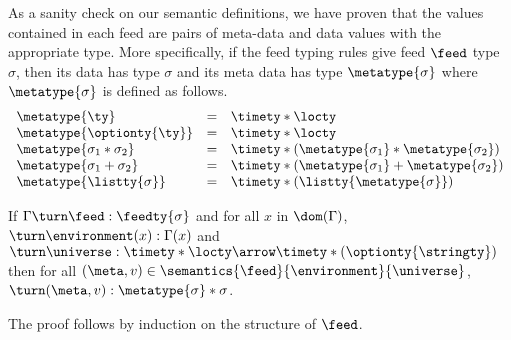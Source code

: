 As a sanity check on our semantic definitions, we have proven
that the values contained in each feed are pairs of meta-data and data
values with the appropriate type.  More specifically, if the feed typing
rules give feed $\feed$ type $\sigma$, then its data has type $\sigma$ and
its meta data has type $\metatype{\sigma}$ where $\metatype{\sigma}$ is
defined as follows.
\[
\begin {array} {lcl}
\metatype{\ty} & = & \timety * \locty \\
\metatype{\optionty{\ty}} & = & \timety * \locty \\
\metatype{\sigma_1 * \sigma_2} & = & \timety * (\metatype{\sigma_1} * \metatype{\sigma_2}) \\
\metatype{\sigma_1 + \sigma_2} & = & \timety * (\metatype{\sigma_1} + \metatype{\sigma_2}) \\
\metatype{\listty{\sigma}} & = & \timety * (\listty{\metatype{\sigma}}) \\
\end{array}
\]
\begin{theorem}
If $\Gamma \turn \feed : \feedty{\sigma}$ and
for all $x$ in $\dom(\Gamma)$, $\turn \environment(x) : \Gamma(x)$
and $\turn \universe : \timety * \locty \arrow \timety * (\optionty{\stringty})$
then
for all $(\meta,v) \in \semantics{\feed}{\environment}{\universe}$,
$\turn (\meta,v) : \metatype{\sigma} * \sigma$. 
\end{theorem}
The proof follows by induction on the structure of $\feed$.



